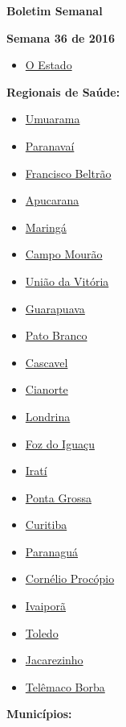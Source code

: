 \documentclass[10pt]{article} %
\begin{document}
\begin{minipage}[t]{.30\linewidth} %
\begin{mdframed}[style=sidebar,frametitle={}] %


\hypertarget{contents}{\textbf{{\large Boletim Semanal}}} 

\textbf{Semana 36 de 2016} %

\begin{itemize}
\item \hyperlink{estado}{O Estado} 
\end{itemize}


\textbf{Regionais de Saúde:}


\begin{itemize}\item \hyperlink{Umrm}{Umuarama}
\item \hyperlink{Prnv}{Paranavaí}
\item \hyperlink{FrnB}{Francisco Beltrão}
\item \hyperlink{Apcr}{Apucarana}
\item \hyperlink{Mrng}{Maringá}
\item \hyperlink{CmpM}{Campo Mourão}
\item \hyperlink{UndV}{União da Vitória}
\item \hyperlink{Grpv}{Guarapuava}
\item \hyperlink{PtBr}{Pato Branco}
\item \hyperlink{Cscv}{Cascavel}
\item \hyperlink{Cnrt}{Cianorte}
\item \hyperlink{Lndr}{Londrina}
\item \hyperlink{FzdI}{Foz do Iguaçu}
\item \hyperlink{Irat}{Iratí}
\item \hyperlink{PntG}{Ponta Grossa}
\item \hyperlink{Crtb}{Curitiba}
\item \hyperlink{Prng}{Paranaguá}
\item \hyperlink{CrnP}{Cornélio Procópio}
\item \hyperlink{Ivpr}{Ivaiporã}
\item \hyperlink{Told}{Toledo}
\item \hyperlink{Jcrz}{Jacarezinho}
\item \hyperlink{TlmB}{Telêmaco Borba}\end{itemize}
\textbf{Municípios:}


\end{mdframed}
\end{minipage}
\end{document}

